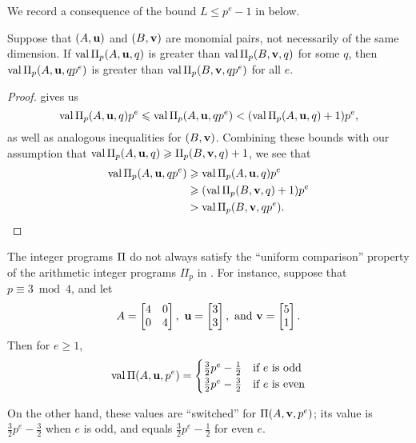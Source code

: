 \documentclass{amsart}
\begin{document}
We record a consequence of the bound $L \leq p^e-1$ in  below.

\begin{corollary}
   \label{cor: mu comparison}
   Suppose that $(A,\mathbf{u})$ and $(B,\mathbf{v})$ are monomial pairs, not necessarily of the same dimension.
   If $\operatorname{val} \Pi_p(A, \mathbf{u}, q)$ is greater than $\operatorname{val} \Pi_p(B, \mathbf{v}, q)$ for some $q$, then $\operatorname{val} \Pi_p(A, \mathbf{u}, qp^e)$ is greater than $\operatorname{val} \Pi_p(B, \mathbf{v}, qp^e)$ for all $e$.
\end{corollary}

\begin{proof}
    gives us
   \begin{equation*}
      \operatorname{val} \Pi_p(A, \mathbf{u},q)p^e \leqslant \operatorname{val} \Pi_p(A, \mathbf{u}, qp^e) < (\operatorname{val} \Pi_p(A, \mathbf{u}, q)+1)p^e,
   \end{equation*}
   as well as analogous inequalities for $(B,\mathbf{v})$.
   Combining these bounds with our assumption that $\operatorname{val} \Pi_p(A, \mathbf{u}, q) \geqslant \Pi_p(B, \mathbf{v}, q) + 1$, we see that
   \begin{align*}
     \operatorname{val} \Pi_p(A, \mathbf{u}, qp^e)  &\geqslant \operatorname{val} \Pi_p(A, \mathbf{u}, q)  p^e \\
                                  &\geqslant (\operatorname{val} \Pi_p(B, \mathbf{v}, q)+1) p^e \\
                                  & > \operatorname{val} \Pi_p(B, \mathbf{v}, qp^e). \qedhere
   \end{align*}
\end{proof}

\begin{remark}
The integer programs $\Pi$ do not always satisfy the ``uniform comparison'' property of the arithmetic integer programs $\Pi_p$ in  .
For instance, suppose that $p \equiv 3 \bmod 4$, and let
\[
 A = \begin{bmatrix} 4 & 0 \\ 0 & 4\end{bmatrix},  \
 \mathbf{u} = \begin{bmatrix}3\\ 3\end{bmatrix}, \text{ and }
 \mathbf{v} = \begin{bmatrix}5 \\ 1\end{bmatrix}.
\]
Then for $e \geq 1$,
\[
\operatorname{val}\Pi(A, \mathbf{u}, p^e) = \begin{cases}
\frac{3}{2}p^e - \frac{1}{2} & \text{if } e \text{ is odd} \\
\frac{3}{2}p^e - \frac{3}{2} & \text{if } e \text{ is even}
\end{cases}
\]

\noindent On the other hand, these values are ``switched'' for $\Pi(A, \mathbf{v}, p^e)$; its value is $\frac{3}{2}p^e - \frac{3}{2}$ when $e$ is odd, and
equals $\frac{3}{2}p^e - \frac{1}{2}$ for even $e$.
\end{remark}
\end{document}
